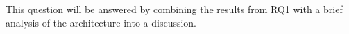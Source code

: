 This question will be answered by combining the results from RQ1 with a brief analysis of the \genusSoftware architecture into a discussion.

%


